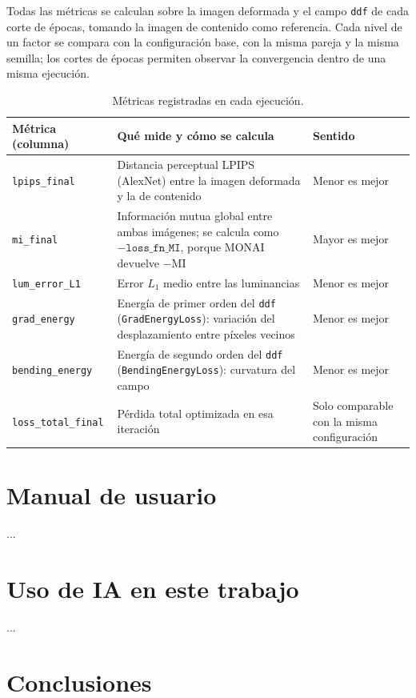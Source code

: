 \documentclass[a4paper]{article}
\begin{document}
Todas las métricas se calculan sobre la imagen deformada y el campo \texttt{ddf} de cada corte de épocas, tomando la imagen de contenido como referencia. Cada nivel de un factor se compara con la configuración base, con la misma pareja y la misma semilla; los cortes de épocas permiten observar la convergencia dentro de una misma ejecución.

\begin{table}[h]
\centering
\begin{tabularx}{\textwidth}{|l|X|l|}
\hline
\textbf{Métrica (columna)} & \textbf{Qué mide y cómo se calcula} & \textbf{Sentido} \\
\hline
\texttt{lpips\_final} & Distancia perceptual LPIPS (AlexNet) entre la imagen deformada y la de contenido & Menor es mejor \\
\hline
\texttt{mi\_final} & Información mutua global entre ambas imágenes; se calcula como $-\texttt{loss\_fn\_MI}$, porque MONAI devuelve $-\mathrm{MI}$ & Mayor es mejor \\
\hline
\texttt{lum\_error\_L1} & Error $L_1$ medio entre las luminancias  & Menor es mejor \\
\hline
\texttt{grad\_energy} & Energía de primer orden del \texttt{ddf} (\texttt{GradEnergyLoss}): variación del desplazamiento entre píxeles vecinos & Menor es mejor \\
\hline
\texttt{bending\_energy} & Energía de segundo orden del \texttt{ddf} (\texttt{BendingEnergyLoss}): curvatura del campo & Menor es mejor \\
\hline
\texttt{loss\_total\_final} & Pérdida total optimizada en esa iteración & Solo comparable con la misma configuración \\
\hline
\end{tabularx}
\caption{Métricas registradas en cada ejecución.}
\end{table}

\section{Manual de usuario}

...

\section{Uso de IA en este trabajo}

...

\section{Conclusiones}
\end{document}
